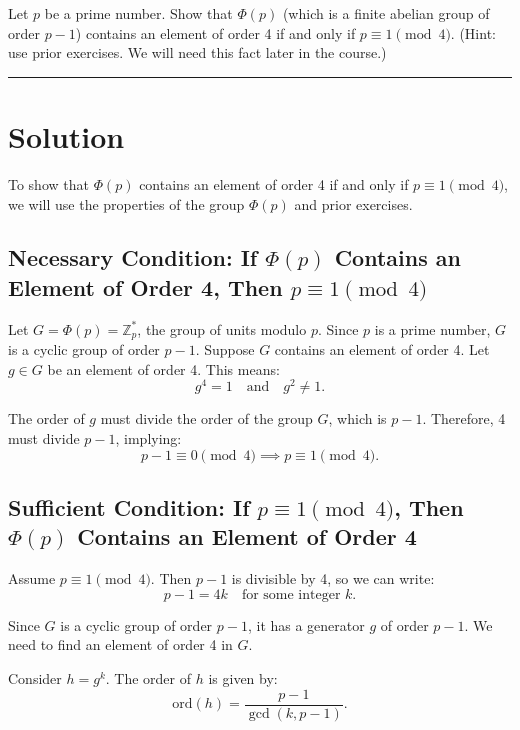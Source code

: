 \documentclass[12pt]{amsart}
\theoremstyle{definition}
\numberwithin{equation}{section}
\newcommand{\Z}{\mathbb{Z}}
\begin{document}
\begin{exercise}{8} Let $p$ be a prime number. Show that \(\Phi(p)\) (which is a finite abelian group of order \(p-1\)) contains an element of order 4 if and only if \(p \equiv 1 \pmod 4\). (Hint: use prior exercises. We will need this fact later in the course.)
    
    \noindent\rule{\linewidth}{1pt}
    
    \section*{Solution}

    To show that \(\Phi(p)\) contains an element of order 4 if and only if \(p \equiv 1 \pmod 4\), we will use the properties of the group \(\Phi(p)\) and prior exercises.
    
    \subsection*{Necessary Condition: If \(\Phi(p)\) Contains an Element of Order 4, Then \(p \equiv 1 \pmod 4\)}
    
    Let \(G = \Phi(p) = \Z_p^*\), the group of units modulo \(p\). Since \(p\) is a prime number, \(G\) is a cyclic group of order \(p-1\). Suppose \(G\) contains an element of order 4. Let \(g \in G\) be an element of order 4. This means:
    \[
    g^4 = 1 \quad \text{and} \quad g^2 \neq 1.
    \]
    
    The order of \(g\) must divide the order of the group \(G\), which is \(p-1\). Therefore, 4 must divide \(p-1\), implying:
    \[
    p-1 \equiv 0 \pmod 4 \implies p \equiv 1 \pmod 4.
    \]
    
    \subsection*{Sufficient Condition: If \(p \equiv 1 \pmod 4\), Then \(\Phi(p)\) Contains an Element of Order 4}
    
    Assume \(p \equiv 1 \pmod 4\). Then \(p-1\) is divisible by 4, so we can write:
    \[
    p-1 = 4k \quad \text{for some integer } k.
    \]
    
    Since \(G\) is a cyclic group of order \(p-1\), it has a generator \(g\) of order \(p-1\). We need to find an element of order 4 in \(G\).
    
    Consider \(h = g^k\). The order of \(h\) is given by:
    \[
    \text{ord}(h) = \frac{p-1}{\gcd(k, p-1)}.
    \]
    

\end{exercise}
\end{document}
